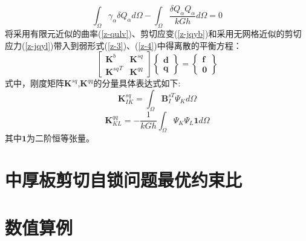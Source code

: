 \begin{equation}\label{z-4}
    \int_{\Omega}\gamma_{\alpha}\delta{Q}_{\alpha}d\Omega-\int_{\Omega}\frac{\delta{Q}_{\alpha}{Q}_{\alpha}}{kGh}d\Omega=0
\end{equation}
将采用有限元近似的曲率(\ref{z-qulv})、剪切应变(\ref{z-jqyb})和采用无网格近似的剪切应力(\ref{z-jqyl})带入到弱形式(\ref{z-3})、(\ref{z-4})中得离散的平衡方程：
\begin{equation} 
    \begin{bmatrix}\pmb{K}^{b}&\pmb{K}^{sq}\\{\pmb{K}^{sq}}^T&\pmb{K}^{qq}\end{bmatrix}
    \begin{Bmatrix}\pmb{d}\\\pmb{q}\end{Bmatrix}=
    \begin{Bmatrix}\pmb{f}\\\pmb{0}\end{Bmatrix}
\end{equation}
式中，刚度矩阵$\boldsymbol K^{sq}$,$\boldsymbol K^{qq}$的分量具体表达式如下:
\begin{equation} 
    \boldsymbol K^{sq}_{IK} = \int_\Omega \boldsymbol B^{sT}_I \Psi_K d\Omega
\end{equation} 
\begin{equation} 
    \boldsymbol K^{qq}_{KL} = -\frac{1}{kGh} \int_\Omega \Psi_K \Psi_L \boldsymbol 1 d\Omega
\end{equation}
其中$\boldsymbol 1$为二阶恒等张量。
\section{中厚板剪切自锁问题最优约束比}

\section{数值算例}
